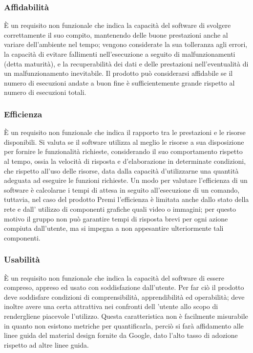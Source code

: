 \subsubsection{Affidabilità}
È un requisito non funzionale che indica la capacità del software di svolgere correttamente il suo compito, mantenendo delle buone prestazioni anche al variare dell'ambiente nel tempo; vengono considerate la sua tolleranza agli errori, la capacità di evitare fallimenti nell’esecuzione a seguito di malfunzionamenti
(detta maturità), e la recuperabilità dei dati e delle prestazioni nell'eventualità di un malfunzionamento inevitabile. Il prodotto può considerarsi affidabile se il numero di esecuzioni andate a buon fine è sufficientemente grande rispetto al numero di esecuzioni totali.

\subsubsection{Efficienza}
È un requisito non funzionale che indica il rapporto tra le prestazioni e le risorse disponibili.
Si valuta se il software utilizza al meglio le risorse a sua disposizione per fornire le funzionalità richieste, considerando il suo comportamento rispetto al tempo, ossia la velocità di risposta e d'elaborazione in determinate condizioni, che rispetto all’uso delle risorse, data dalla capacità d'utilizzarne una quantità adeguata ad eseguire le funzioni richieste. 
Un modo per valutare l’efficienza di un software è calcolarne i tempi di attesa in seguito all’esecuzione di un comando, tuttavia, nel caso del prodotto Premi l'efficienza è limitata anche dallo stato della rete e dall' utilizzo di componenti grafiche quali video o immagini; per questo motivo il gruppo non può garantire tempi di risposta brevi per ogni azione compiuta dall’utente, ma si impegna a non appesantire ulteriormente tali componenti.

\subsubsection{Usabilità}
È un requisito non funzionale che indica la capacità del software di essere compreso, appreso ed usato con soddisfazione dall'utente.
Per far ciò il prodotto deve soddisfare condizioni di comprensibilità, apprendibilità ed operabilità; deve inoltre avere una certa attrattiva nei confronti dell 'utente allo scopo di rendergliene piacevole l’utilizzo. Questa caratteristica non è facilmente misurabile in quanto non esistono metriche per quantificarla, perciò si farà affidamento alle linee guida del material design fornite da Google, dato l'alto tasso di adozione rispetto ad altre linee guida.

